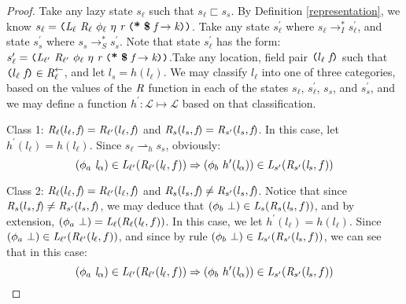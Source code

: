 \begin{proof}%
Take any lazy state $s_\ell$ such that $s_\ell \sqsubset s_s$. By Definition \ref{representation}, we know $s_\ell = \lp \cfgnt{L}_\ell\ \cfgnt{R}_\ell\ \phi_\ell\ \eta\ \cfgnt{r}\ \lp \cfgt{*}\ \cfgt{\$}\ \cfgnt{f} \rightarrow \cfgnt{k}\rp \rp$. Take any state $s_\ell^\prime$ where $s_\ell \rightarrow_I^* s_\ell^\prime$, and state $s_s^\prime$ where $s_s \rightarrow_S^* s_s^\prime$. Note that  state $s_\ell^\prime$ has the form: $s_\ell^\prime = \lp \cfgnt{L}_{\ell^\prime}\ \cfgnt{R}_{\ell^\prime}\ \phi_\ell\ \eta\ \cfgnt{r}\ \lp \cfgt{*}\ \cfgt{\$}\ \cfgnt{f} \rightarrow \cfgnt{k}\rp \rp$.Take any location, field pair $\texttt{(} l_\ell\  \emph{f}\texttt{)}$ such that $\texttt{(} l_\ell\  \emph{f}\texttt{)} \in \emph{R}_{\ell}^\leftarrow$, and let $l_s = h(l_\ell)$. We may classify $l_\ell$ into one of three categories, based on the values of the $\emph{R}$ function in each of the states $s_\ell$, $s_\ell^\prime$, $s_s$, and $s_s^\prime$, and we may define a function $h^\prime: \mathcal{L} \mapsto \mathcal{L}$ based on that classification.

Class 1: $\emph{R}_\ell ( l_\ell,  \emph{f} ) = \emph{R}_{\ell^\prime} ( l_\ell,  \emph{f} )$ and $\emph{R}_{s} ( l_s,  \emph{f} ) = \emph{R}_{s^\prime} ( l_s,  \emph{f})$. In this case, let $h^\prime(l_\ell) = h(l_\ell)$. Since $s_\ell \rightharpoonup_h s_s$, obviously: 
$$(\phi_a\ \emph{l}_\alpha) \in \emph{L}_{\ell^\prime}(\emph{R}_{\ell^\prime} (\emph{l}_\ell,f )) \Rightarrow (\phi_b\ h^\prime (\emph{l}_\alpha))\in \emph{L}_{s^\prime}(\emph{R}_{s^\prime} (\emph{l}_s,f ))$$

Class 2: $\emph{R}_\ell ( l_\ell,  \emph{f}) = \emph{R}_{\ell^\prime} ( l_\ell,  \emph{f})$ and $\emph{R}_{s} ( l_s,  \emph{f}) \neq \emph{R}_{s^\prime} ( l_s,  \emph{f})$. Notice that since $\emph{R}_{s} ( l_s,  \emph{f}) \neq \emph{R}_{s^\prime} ( l_s,  \emph{f})$, we may deduce that $ (\phi_b\ \bot)\in \emph{L}_{s}(\emph{R}_{s} (\emph{l}_s,f ))$, and by extension, ${(\phi_a\ \bot)} = \emph{L}_{\ell}(\emph{R}_{\ell} (\emph{l}_\ell,f )) $. In this case, we let $h^\prime(l_\ell) = h(l_\ell)$. Since $(\phi_a\ \bot) \in \emph{L}_{\ell^\prime}(\emph{R}_{\ell^\prime} (\emph{l}_\ell,f ))$, and since by rule $ (\phi_b\ \bot)\in \cfgnt{L}_{s^\prime}(\cfgnt{R}_{s^\prime} (\cfgnt{l}_s,f ))$, we can see that in this case:
$$(\phi_a\ \emph{l}_\alpha) \in \emph{L}_{\ell^\prime}(\emph{R}_{\ell^\prime} (\emph{l}_\ell,f )) \Rightarrow (\phi_b\ h^\prime (\emph{l}_\alpha))\in \emph{L}_{s^\prime}(\emph{R}_{s^\prime} (\emph{l}_s,f ))$$


\end{proof}
